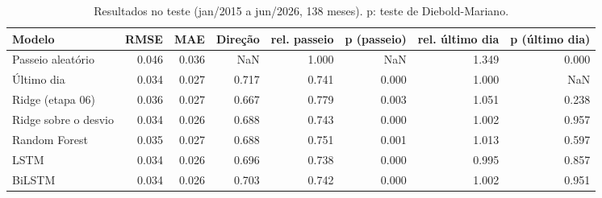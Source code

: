 \begin{table}
\caption{Resultados no teste (jan/2015 a jun/2026, 138 meses). p: teste de Diebold-Mariano.}
\label{tab:tab4_modelos}
\begin{tabular}{lrrrrrrr}
\toprule
Modelo & RMSE & MAE & Direção & rel. passeio & p (passeio) & rel. último dia & p (último dia) \\
\midrule
Passeio aleatório & 0.046 & 0.036 & NaN & 1.000 & NaN & 1.349 & 0.000 \\
Último dia & 0.034 & 0.027 & 0.717 & 0.741 & 0.000 & 1.000 & NaN \\
Ridge (etapa 06) & 0.036 & 0.027 & 0.667 & 0.779 & 0.003 & 1.051 & 0.238 \\
Ridge sobre o desvio & 0.034 & 0.026 & 0.688 & 0.743 & 0.000 & 1.002 & 0.957 \\
Random Forest & 0.035 & 0.027 & 0.688 & 0.751 & 0.001 & 1.013 & 0.597 \\
LSTM & 0.034 & 0.026 & 0.696 & 0.738 & 0.000 & 0.995 & 0.857 \\
BiLSTM & 0.034 & 0.026 & 0.703 & 0.742 & 0.000 & 1.002 & 0.951 \\
\bottomrule
\end{tabular}
\end{table}
